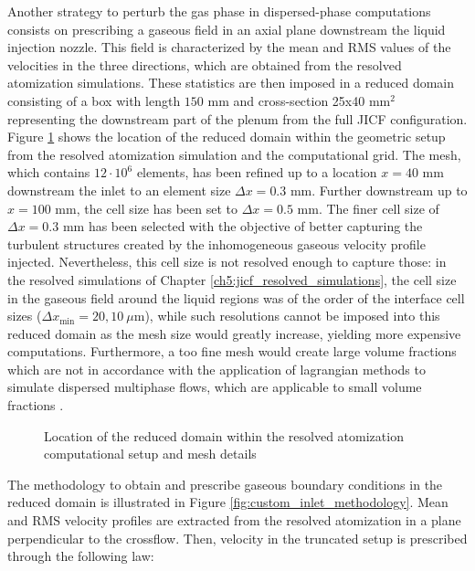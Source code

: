 Another strategy to perturb the gas phase in dispersed-phase computations consists on prescribing a gaseous field in an axial plane downstream the liquid injection nozzle. This field is characterized by the mean and RMS values of the velocities in the three directions, which are obtained from the resolved atomization simulations. These statistics are then imposed in a reduced domain consisting of a box with length $150$ mm and cross-section 25x40 mm$^2$ representing the downstream part of the plenum from the full JICF configuration. Figure \ref{fig:mesh_reduced_inlet} shows the location of the reduced domain within the geometric setup from the resolved atomization simulation and the computational grid. The mesh, which contains $12 \cdot 10^6$ elements, has been refined up to a location $x = 40$ mm downstream the inlet to an element size $\Delta x = 0.3$ mm.  Further downstream up to $x = 100$ mm, the cell size has been set to $\Delta x = 0.5$ mm. The finer cell size of $\Delta x = 0.3$ mm has been selected  with the objective of better capturing the turbulent structures created by the inhomogeneous gaseous velocity profile injected. Nevertheless, this cell size is not resolved enough to capture those: in the resolved simulations of Chapter \ref{ch5:jicf_resolved_simulations}, the cell size in the gaseous field around the liquid regions was of the order of the interface cell sizes ($\Delta x_\mathrm{min} = 20, 10~\mu$m), while such resolutions cannot be imposed into this reduced domain as the mesh size would greatly increase, yielding more expensive computations. Furthermore, a too fine mesh would create large volume fractions which are not in accordance with the application of lagrangian methods to simulate dispersed multiphase flows, which are applicable to small volume fractions .


\begin{figure}[h!]	
	\centering	
	\caption{Location of the reduced domain within the resolved atomization computational setup and mesh details}
	\label{fig:mesh_reduced_inlet}
\end{figure}






The methodology to obtain and prescribe gaseous boundary conditions in the reduced domain is illustrated in Figure \ref{fig:custom_inlet_methodology}. Mean and RMS velocity profiles are extracted from the resolved atomization in a plane perpendicular to the crossflow. Then, velocity in the truncated setup is prescribed through the following law:

